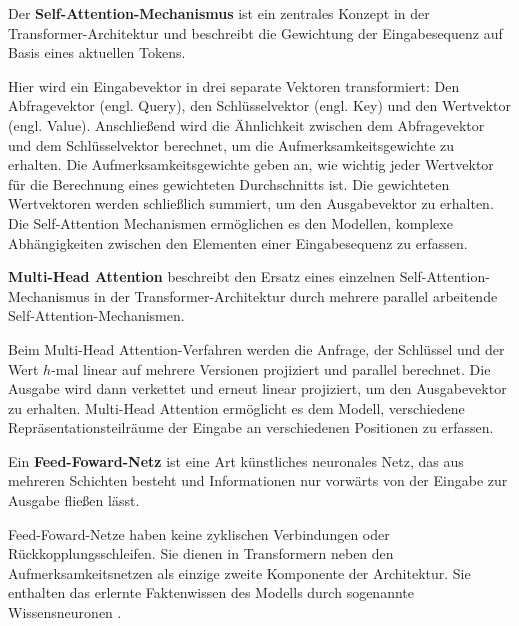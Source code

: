 \begin{definition}\label{def:self-attention-mechanismus}
    Der \textbf{Self-Attention-Mechanismus} ist ein zentrales Konzept in der Transformer-Architektur und beschreibt die Gewichtung der Eingabesequenz auf Basis eines aktuellen Tokens.
\end{definition}
Hier wird ein Eingabevektor in drei separate Vektoren transformiert:
Den Abfragevektor (engl. Query), den Schlüsselvektor (engl. Key) und den Wertvektor (engl. Value).
Anschließend wird die Ähnlichkeit zwischen dem Abfragevektor und dem Schlüsselvektor berechnet,
um die Aufmerksamkeitsgewichte zu erhalten.
Die Aufmerksamkeitsgewichte geben an, wie wichtig jeder Wertvektor für die Berechnung eines gewichteten
Durchschnitts ist. Die gewichteten Wertvektoren werden schließlich summiert, um den Ausgabevektor zu erhalten.
Die Self-Attention Mechanismen ermöglichen es den Modellen, komplexe Abhängigkeiten zwischen den Elementen einer Eingabesequenz zu erfassen.\\

\begin{definition}\label{def:multi-head-attention}
    \textbf{Multi-Head Attention} beschreibt den Ersatz eines einzelnen Self-Attention-Mechanismus in der Transformer-Architektur durch mehrere parallel arbeitende Self-Attention-Mechanismen.
\end{definition}
Beim Multi-Head Attention-Verfahren werden die Anfrage, der Schlüssel und der Wert $h$-mal linear auf mehrere Versionen projiziert und parallel berechnet. Die Ausgabe wird dann verkettet und erneut linear projiziert, um den Ausgabevektor zu erhalten. Multi-Head Attention ermöglicht es dem Modell, verschiedene Repräsentationsteilräume der Eingabe an verschiedenen Positionen zu erfassen.

\begin{definition}\label{def:feed-forward-netz}
    Ein \textbf{Feed-Foward-Netz} ist eine Art künstliches neuronales Netz, das aus mehreren Schichten besteht und Informationen nur vorwärts von der Eingabe zur Ausgabe fließen lässt.
\end{definition}
Feed-Foward-Netze haben keine zyklischen Verbindungen oder Rückkopplungsschleifen.
Sie dienen in Transformern neben den Aufmerksamkeitsnetzen als einzige zweite Komponente der Architektur.
Sie enthalten das erlernte Faktenwissen des Modells durch sogenannte Wissensneuronen \citep{knowledge_neurons}.\\

